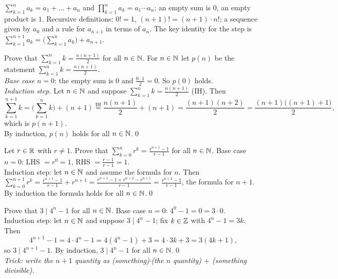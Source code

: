 \begin{key}
$\sum_{k=1}^{n}a_k=a_1+\dots+a_n$ and $\prod_{k=1}^na_k=a_1\cdots a_n$; an empty sum is $0$, an empty product is $1$. Recursive definitions: $0!=1$, $(n+1)!=(n+1)\cdot n!$; a sequence given by $a_0$ and a rule for $a_{n+1}$ in terms of $a_n$. The key identity for the step is $\sum_{k=1}^{n+1}a_k=\big(\sum_{k=1}^na_k\big)+a_{n+1}$.
\end{key}

\begin{hexample}
Prove that $\displaystyle\sum_{k=1}^{n}k=\frac{n(n+1)}2$ for all $n\in\mathbb{N}$.
\solution
For $n\in\mathbb{N}$ let $p(n)$ be the statement $\sum_{k=1}^nk=\frac{n(n+1)}2$.\\
\emph{Base case} $n=0$: the empty sum is $0$ and $\frac{0\cdot1}2=0$. So $p(0)$ holds.\\
\emph{Induction step.} Let $n\in\mathbb{N}$ and suppose $\sum_{k=1}^nk=\frac{n(n+1)}2$ (IH). Then
\[
\sum_{k=1}^{n+1}k=\Big(\sum_{k=1}^{n}k\Big)+(n+1)\overset{\text{IH}}{=}\frac{n(n+1)}2+(n+1)=\frac{(n+1)(n+2)}2=\frac{(n+1)\big((n+1)+1\big)}2,
\]
which is $p(n+1)$.\\
By induction, $p(n)$ holds for all $n\in\mathbb{N}$.\qed
\end{hexample}

\begin{hexample}
Let $r\in\mathbb{R}$ with $r\ne1$. Prove that $\displaystyle\sum_{k=0}^{n}r^k=\frac{r^{n+1}-1}{r-1}$ for all $n\in\mathbb{N}$.
\solution
Base case $n=0$: LHS $=r^0=1$, RHS $=\frac{r-1}{r-1}=1$.\\
Induction step: let $n\in\mathbb{N}$ and assume the formula for $n$. Then
$\sum_{k=0}^{n+1}r^k=\frac{r^{n+1}-1}{r-1}+r^{n+1}=\frac{r^{n+1}-1+r^{n+2}-r^{n+1}}{r-1}=\frac{r^{n+2}-1}{r-1}$, the formula for $n+1$.\\
By induction the formula holds for all $n\in\mathbb{N}$.\qed
\end{hexample}

\begin{hexample}[divisibility]
Prove that $3\mid 4^n-1$ for all $n\in\mathbb{N}$.
\solution
Base case $n=0$: $4^0-1=0=3\cdot0$. \\
Induction step: let $n\in\mathbb{N}$ and suppose $3\mid4^n-1$; fix $k\in\mathbb{Z}$ with $4^n-1=3k$. Then
\[
4^{n+1}-1=4\cdot4^n-1=4(4^n-1)+3=4\cdot3k+3=3(4k+1),
\]
so $3\mid4^{n+1}-1$. By induction, $3\mid4^n-1$ for all $n\in\mathbb{N}$.\qed\\
\emph{Trick: write the $n+1$ quantity as (something)$\cdot$(the $n$ quantity) $+$ (something divisible).}
\end{hexample}

